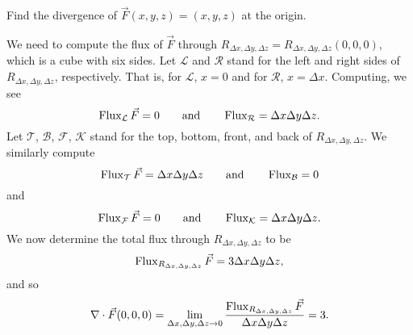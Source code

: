 \begin{example}
	Find the divergence of $\vec F(x,y,z)=(x,y,z)$ at the origin.

	We need to compute the flux of $\vec F$ through $R_{\Delta x,\Delta y,\Delta z} = R_{\Delta x,\Delta y,\Delta z}(0,0,0)$,
	which is a cube with six sides.  Let $\mathcal L$ and $\mathcal R$ stand for the left and
	right sides of $R_{\Delta x,\Delta y, \Delta z}$, respectively.
	That is, for $\mathcal L$, $x=0$ and for $\mathcal R$, $x=\Delta x$.  Computing, we see
	\[
		\operatorname{Flux}_{\mathcal L}\vec F = 0\qquad\text{and}
		\qquad \operatorname{Flux}_{\mathcal R} = \Delta x\Delta y\Delta z.
	\]
	Let $\mathcal T$, $\mathcal B$, $\mathcal F$, $\mathcal K$ stand for the top, bottom, front,
	and back of $R_{\Delta x,\Delta y,\Delta z}$.  We similarly compute
	\[
		\operatorname{Flux}_{\mathcal T}\vec F = \Delta x\Delta y\Delta z\qquad\text{and}
		\qquad \operatorname{Flux}_{\mathcal B} = 0
	\]
	and
	\[
		\operatorname{Flux}_{\mathcal F}\vec F = 0\qquad\text{and}
		\qquad \operatorname{Flux}_{\mathcal K} = \Delta x\Delta y\Delta z.
	\]
	We now determine the total flux through $R_{\Delta x,\Delta y, \Delta z}$ to be
	\[
		\operatorname{Flux}_{R_{\Delta x,\Delta y, \Delta z}}\vec F = 3\Delta x\Delta y\Delta z,
	\]
	and so
	\[
		\nabla \cdot \vec F(0,0,0) = \lim_{\Delta x,\Delta y,\Delta z\to 0}\frac{\operatorname{Flux}_{R_{\Delta x,\Delta y, \Delta z}}\vec F}{\Delta x\Delta y\Delta z} = 3.
	\]
\end{example}

